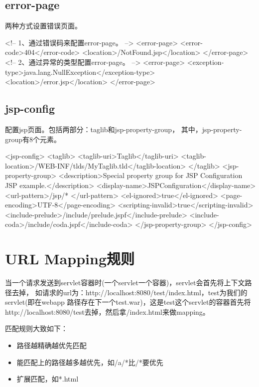 \documentclass[a4paper,11pt]{article}
\begin{document}
\subsection[error-page]{error-page}
两种方式设置错误页面。

\begin{xmlcode}
<!-- 1、通过错误码来配置error-page。 -->
<error-page>
    <error-code>404</error-code>
    <location>/NotFound.jsp</location>
</error-page>
<!-- 2、通过异常的类型配置error-page。 -->
<error-page>
    <exception-type>java.lang.NullException</exception-type>
    <location>/error.jsp</location>
</error-page>
\end{xmlcode}

\subsection[jsp-config]{jsp-config}
配置jsp页面。包括两部分：taglib和jsp-property-group，
其中，jsp-property-group有8个元素。

\begin{xmlcode}
<jsp-config>
    <taglib>
        <taglib-uri>Taglib</taglib-uri>
        <taglib-location>/WEB-INF/tlds/MyTaglib.tld</taglib-location>
    </taglib>
    <jsp-property-group>
        <description>Special property group for JSP Configuration JSP example.</description>
        <display-name>JSPConfiguration</display-name>
        <url-pattern>/jsp/* </url-pattern>
        <el-ignored>true</el-ignored>
        <page-encoding>UTF-8</page-encoding>
        <scripting-invalid>true</scripting-invalid>
        <include-prelude>/include/prelude.jspf</include-prelude>
        <include-coda>/include/coda.jspf</include-coda>
    </jsp-property-group>
</jsp-config>
\end{xmlcode}

\section[URL Mapping规则]{URL Mapping规则}
当一个请求发送到servlet容器时(一个servlet一个容器)，servlet会首先将上下文路径去掉，
如请求的url为：http://localhost:8080/test/index.html，test为我们的servlet(即在webapp
路径存在下一个test.war)，这是test这个servlet的容器首先将
http://localhost:8080/test去掉，然后拿/index.html来做mapping。

匹配规则大致如下：

\begin{itemize}
\item 路径越精确越优先匹配
\item 能匹配上的路径越多越优先，如/a/*比/*要优先
\item 扩展匹配，如*.html
\end{itemize}
\end{document}
